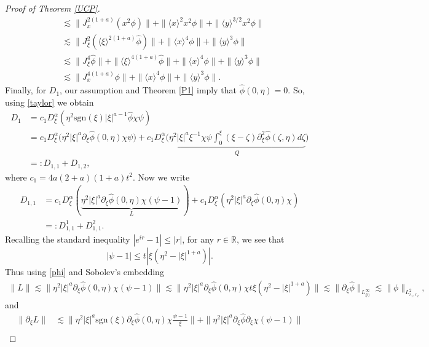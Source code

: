 \documentclass[reqno]{amsart}
\newcommand{\ha}{\hat{\phi}}
\newcommand{\les}{\lesssim}
\newcommand{\lan}{\langle \xi \rangle}
\newcommand{\La}{\|\phi\|_{L^2_{r_1,r_2}}}
\newcommand{\lanx}{\langle x \rangle}
\newcommand{\lany}{\langle y \rangle}
\newcommand{\dt}{D^{\alpha}_\xi}
\newcommand{\R}{\mathbb R}
\newcommand{\p}{\partial}
\newcommand{\sgn}{\text{sgn}}
\numberwithin{equation}{section}
\begin{document}
\begin{proof}[Proof of Theorem \ref{UCP}]
\begin{equation*}
\begin{split}
&\lesssim \|J_x^{2(1+a)}(x^2\phi)\|+\|\lanx^2 x^2\phi\|+\|\lany^{3/2}x^2\phi\|\\
&\les\|J_\xi^2(\lan^{2(1+a)}\ha)\|+\|\lanx^4 \phi\|+\|\lany^3\phi\|\\
&\les\|J_\xi^4 \ha\|+\|\lan^{4(1+a)}\ha\|+\|\lanx^4 \phi\|+\|\lany^3\phi\|\\
&\les\|J_x^{4(1+a)}\phi\|+\|\lanx^4 \phi\|+\|\lany^3\phi\|.
\end{split}
\end{equation*}
Finally, for $D_1$, our assumption and Theorem \ref{P1} imply that $\hat{\phi}(0,\eta)=0$. So, using \eqref{taylor} we obtain
\begin{equation}
\begin{split}\label{identQ}
D_1&=c_1\dt(\eta^2 \sgn(\xi)|\xi|^{a-1}\ha \chi \psi)\\
&= c_1\dt \Big(\eta^2 |\xi|^a \p_\xi \ha(0,\eta)\chi \psi\Big)+c_1\dt \Big(\underbrace{\eta^2 |\xi|^a \xi^{-1}\chi\psi\int_0^\xi (\xi-\zeta)\partial_\xi^2 \hat{\phi}(\zeta,\eta)d\zeta}_{Q}\Big)\\
&=:D_{1,1}+D_{1,2},
\end{split}
\end{equation}
where $c_1=4a(2+a)(1+a)t^2$. Now we write
\begin{equation*}
\begin{split}
D_{1,1}&=c_1 \dt(\underbrace{\eta^2 |\xi|^{a}\p_\xi\ha(0,\eta) \chi (\psi-1)}_{L})+c_1\dt(\eta^2 |\xi|^{a}\p_\xi\ha(0,\eta) \chi) \\
&=:D_{1,1}^1+D_{1,1}^2.
\end{split}
\end{equation*}
Recalling the standard inequality $|e^{ir}-1|\leq |r|$, for any $r\in\R$, we see that
\begin{equation}\label{phi}
|\psi-1|\leq t|\xi(\eta^2-|\xi|^{1+a})|.
\end{equation}
Thus using \eqref{phi} and Sobolev's embedding
\begin{equation*}
\begin{split}
\|L\|\lesssim \|\eta^2 |\xi|^a \p_\xi \ha(0,\eta)\chi(\psi-1)\|
\lesssim \|\eta^2 |\xi|^a \p_\xi \ha(0,\eta)\chi t \xi(\eta^2-|\xi|^{1+a})\|
\lesssim \|\p_\xi \ha\|_{L^\infty_{\xi\eta}}
\les\La,
\end{split}
\end{equation*}
and
\begin{equation*}
\begin{split}
\|\p_\xi L\|&\lesssim \|\eta^2 |\xi|^a \sgn(\xi) \p_\xi \ha(0,\eta)\chi\frac{\psi-1}{\xi}\|+\|\eta^2 |\xi|^a \p_\xi \ha \p_\xi \chi (\psi-1)\|\\

\end{split}
\end{equation*}
\end{proof}
\end{document}
